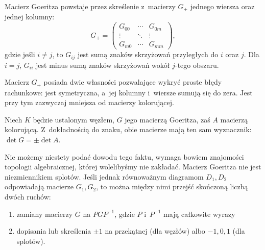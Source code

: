 \begin{definition}
    Macierz Goeritza powstaje przez skreślenie z~macierzy $G_+$ jednego wiersza oraz jednej kolumny:
    \[
        G_+=\begin{pmatrix}
        G_{00} & \cdots & G_{0m} \\
        \vdots & \ddots & \vdots \\
        G_{m0} & \cdots & G_{mm}
        \end{pmatrix},
    \]
    gdzie jeśli $i\neq j$, to $G_{ij}$ jest sumą znaków skrzyżowań przyległych do $i$ oraz $j$.
    Dla $i = j$, $G_{ii}$ jest minus sumą znaków skrzyżowań wokół $j$-tego obszaru.
\end{definition}

Macierz $G_+$ posiada dwie własności pozwalające wykryć proste błędy rachunkowe: jest symetryczna, a~jej kolumny i~wiersze sumują się do zera.
Jest przy tym zazwyczaj mniejsza od macierzy kolorującej.

\begin{proposition}
    Niech $K$ będzie ustalonym węzłem, $G$ jego macierzą Goeritza, zaś $A$ macierzą kolorującą.
    Z~dokładnością do znaku, obie macierze mają ten sam wyznacznik: $\det G = \pm \det A$.
\end{proposition}

Nie możemy niestety podać dowodu tego faktu, wymaga bowiem znajomości topologii algebraicznej, której wolelibyśmy nie zakładać.
Macierz Goeritza nie jest niezmiennikiem splotów.
Jeśli jednak równoważnym diagramom $D_1, D_2$ odpowiadają macierze $G_1, G_2$, to można między nimi przejść skończoną liczbą dwóch ruchów:
\begin{enumerate}[leftmargin=*]
\itemsep0em
    \item zamiany macierzy $G$ na $PGP^{-1}$, gdzie $P$ i~$P^{-1}$ mają całkowite wyrazy
    \item dopisania lub skreślenia $\pm 1$ na przekątnej (dla węzłów) albo $-1, 0, 1$ (dla splotów).
\end{enumerate}





